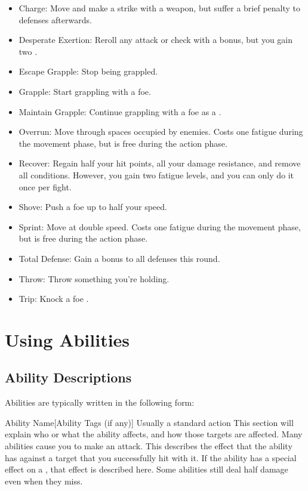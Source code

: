   \begin{itemize}
    \item Charge: Move and make a strike with a weapon, but suffer a brief  penalty to defenses afterwards.
    \item Desperate Exertion: Reroll any attack or check with a  bonus, but you gain two .
    \item Escape Grapple: Stop being grappled.
    \item Grapple: Start grappling with a foe.
    \item Maintain Grapple: Continue grappling with a foe as a .
    \item Overrun: Move through spaces occupied by enemies. Costs one fatigue during the movement phase, but is free during the action phase.
    \item Recover: Regain half your hit points, all your damage resistance, and remove all conditions. However, you gain two fatigue levels, and you can only do it once per fight.
    \item Shove: Push a foe up to half your speed.
    \item Sprint: Move at double speed. Costs one fatigue during the movement phase, but is free during the action phase.
    \item Total Defense: Gain a  bonus to all defenses this round.
    \item Throw: Throw something you're holding.
    \item Trip: Knock a foe \prone.
  \end{itemize}

\section{Using Abilities}\label{Using Abilities}

  \subsection{Ability Descriptions}
    Abilities are typically written in the following form:
    \begin{activeability}{Ability Name}[Ability Tags (if any)]
      \abilityusagetime Usually a standard action
      \rankline
      This section will explain who or what the ability affects, and how those targets are affected.
      Many abilities cause you to make an attack.
      \hit This describes the effect that the ability has against a target that you successfully hit with it.
      \crit If the ability has a special effect on a , that effect is described here.
      \miss Some abilities still deal half damage even when they miss.
    \end{activeability}

